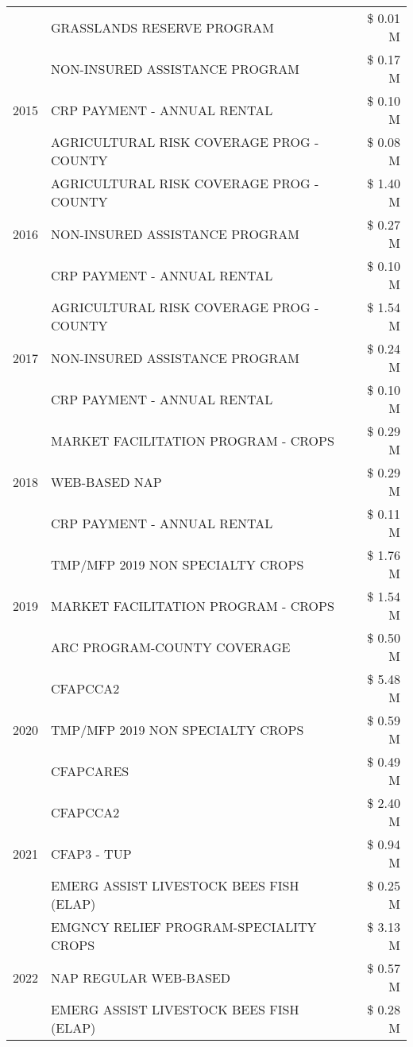 \begin{tabular}{llr}
 & GRASSLANDS RESERVE PROGRAM & \$ 0.01 M \\
\cline{1-3}
\multirow[t]{3}{*}{2015} & NON-INSURED ASSISTANCE PROGRAM & \$ 0.17 M \\
 & CRP PAYMENT - ANNUAL RENTAL & \$ 0.10 M \\
 & AGRICULTURAL RISK COVERAGE PROG - COUNTY & \$ 0.08 M \\
\cline{1-3}
\multirow[t]{3}{*}{2016} & AGRICULTURAL RISK COVERAGE PROG - COUNTY & \$ 1.40 M \\
 & NON-INSURED ASSISTANCE PROGRAM & \$ 0.27 M \\
 & CRP PAYMENT - ANNUAL RENTAL & \$ 0.10 M \\
\cline{1-3}
\multirow[t]{3}{*}{2017} & AGRICULTURAL RISK COVERAGE PROG - COUNTY & \$ 1.54 M \\
 & NON-INSURED ASSISTANCE PROGRAM & \$ 0.24 M \\
 & CRP PAYMENT - ANNUAL RENTAL & \$ 0.10 M \\
\cline{1-3}
\multirow[t]{3}{*}{2018} & MARKET FACILITATION PROGRAM - CROPS & \$ 0.29 M \\
 & WEB-BASED NAP & \$ 0.29 M \\
 & CRP PAYMENT - ANNUAL RENTAL & \$ 0.11 M \\
\cline{1-3}
\multirow[t]{3}{*}{2019} & TMP/MFP 2019 NON SPECIALTY CROPS & \$ 1.76 M \\
 & MARKET FACILITATION PROGRAM - CROPS & \$ 1.54 M \\
 & ARC PROGRAM-COUNTY COVERAGE & \$ 0.50 M \\
\cline{1-3}
\multirow[t]{3}{*}{2020} & CFAPCCA2 & \$ 5.48 M \\
 & TMP/MFP 2019 NON SPECIALTY CROPS & \$ 0.59 M \\
 & CFAPCARES & \$ 0.49 M \\
\cline{1-3}
\multirow[t]{3}{*}{2021} & CFAPCCA2 & \$ 2.40 M \\
 & CFAP3 - TUP & \$ 0.94 M \\
 & EMERG ASSIST LIVESTOCK BEES FISH (ELAP) & \$ 0.25 M \\
\cline{1-3}
\multirow[t]{3}{*}{2022} & EMGNCY RELIEF PROGRAM-SPECIALITY CROPS & \$ 3.13 M \\
 & NAP REGULAR WEB-BASED & \$ 0.57 M \\
 & EMERG ASSIST LIVESTOCK BEES FISH (ELAP) & \$ 0.28 M \\
\cline{1-3}
\bottomrule
\end{tabular}
